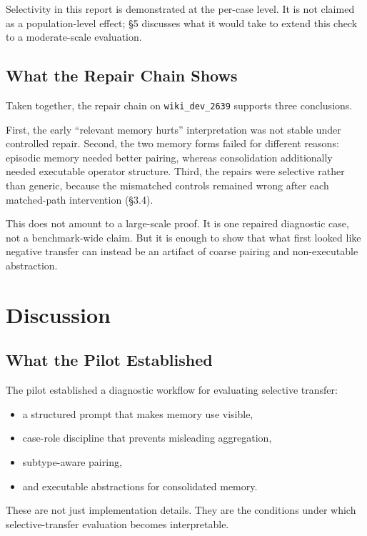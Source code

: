 \documentclass[11pt]{article}
\begin{document}
Selectivity in this report is demonstrated at the per-case level. It is not claimed as a population-level effect; \S5 discusses what it would take to extend this check to a moderate-scale evaluation.

\subsection{What the Repair Chain Shows}

Taken together, the repair chain on \texttt{wiki\_dev\_2639} supports three conclusions.

First, the early ``relevant memory hurts'' interpretation was not stable under controlled repair. Second, the two memory forms failed for different reasons: episodic memory needed better pairing, whereas consolidation additionally needed executable operator structure. Third, the repairs were selective rather than generic, because the mismatched controls remained wrong after each matched-path intervention (\S3.4).

This does not amount to a large-scale proof. It is one repaired diagnostic case, not a benchmark-wide claim. But it is enough to show that what first looked like negative transfer can instead be an artifact of coarse pairing and non-executable abstraction.

\section{Discussion}

\subsection{What the Pilot Established}

The pilot established a diagnostic workflow for evaluating selective transfer:

\begin{itemize}
\item a structured prompt that makes memory use visible,
\item case-role discipline that prevents misleading aggregation,
\item subtype-aware pairing,
\item and executable abstractions for consolidated memory.
\end{itemize}

These are not just implementation details. They are the conditions under which selective-transfer evaluation becomes interpretable.
\end{document}
